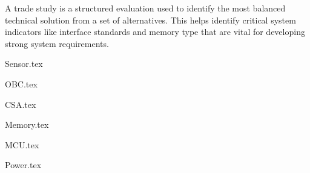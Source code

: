 A trade study is a structured evaluation used to identify the most balanced technical solution from a set of alternatives. This helps identify critical system indicators like interface standards and memory type that are vital for developing strong system requirements.

\label{sec:v1-trade-cis}
    {Sensor.tex}

    {OBC.tex}

\label{sec:v1-trade-csa}
    {CSA.tex}

\label{sec:v1-trade-memory}
    {Memory.tex}

\label{sec:v1-trade-mcu}
    {MCU.tex}

    {Power.tex}